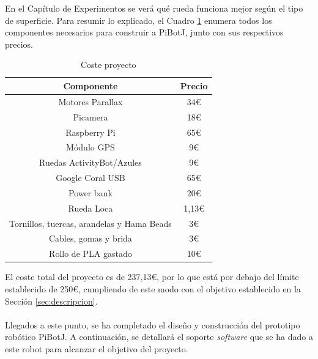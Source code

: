 En el Capítulo de Experimentos se verá qué rueda funciona mejor según el tipo de superficie. Para resumir lo explicado, el Cuadro \ref{cuadro:costetotal} enumera todos los componentes necesarios para construir a PiBotJ, junto con sus respectivos precios.

\begin{table}[H]
	\begin{center}
		\begin{tabular}{|c|c|}
			\hline
			Componente & Precio \\
			\hline
			Motores Parallax & 34€ \\
			\hline
			Picamera &  18€ \\
			\hline
			Raspberry Pi & 65€ \\
			\hline
			Módulo \acs{GPS} & 9€ \\
			\hline
			Ruedas ActivityBot/Azules & 9€ \\
			\hline
			Google Coral USB & 65€ \\
			\hline
			Power bank & 20€ \\
			\hline
			Rueda Loca & 1,13€ \\
			\hline
			Tornillos, tuercas, arandelas y Hama Beads & 3€ \\
			\hline
			Cables, gomas y brida & 3€ \\
			\hline
			Rollo de PLA gastado & 10€ \\
			\hline
		\end{tabular}
		\caption{Coste proyecto}
		\label{cuadro:costetotal}
	\end{center}
\end{table}

El coste total del proyecto es de 237,13€, por lo que está por debajo del límite establecido de 250€, cumpliendo de este modo con el objetivo establecido en la Sección \ref{sec:descripcion}.\\\\



Llegados a este punto, se ha completado el diseño y construcción del prototipo robótico PiBotJ. A continuación, se detallará el soporte \textit{software} que se ha dado a este robot para alcanzar el objetivo del proyecto.

